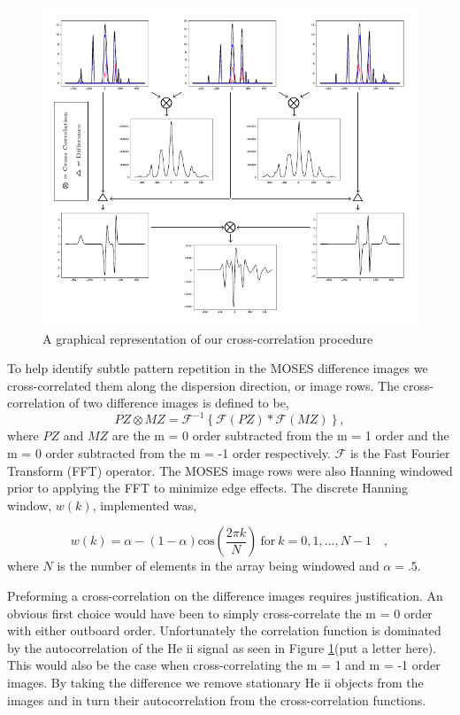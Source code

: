 \documentclass[]{solarphysics}
\begin{document}
\begin{article}
 	 	
 	 	\begin{figure}
 	 		\includegraphics[scale = 1]{methods_fig.pdf}
 	 		\caption{A graphical representation of our cross-correlation procedure}
 	 		\label{fig:methods}
 	 	\end{figure}
	
 	To help identify subtle pattern repetition in the MOSES difference images we cross-correlated them along the dispersion direction, or image rows.  The cross-correlation of two difference images is defined to be,
	 	\begin{equation}
		 	PZ \otimes MZ = \mathcal{F}^{-1} \left\{\mathcal{F}\left(PZ \right)*\mathcal{F}\left(MZ \right)  \right\},
	 	\end{equation}
 	where $PZ$ and $MZ$ are the m = 0 order subtracted from the m = 1 order and the m = 0 order subtracted from the m = -1 order respectively. $\mathcal{F}$ is the Fast Fourier Transform (FFT) operator.  The MOSES image rows were also Hanning windowed prior to applying the FFT to minimize edge effects.  The discrete Hanning window, $w(k)$, implemented was,
 	
		\begin{equation}
			w(k) = \alpha - (1-\alpha)\mathrm{cos}\left( \frac{2\pi k}{N} \right) \ \mathrm{for} \ k = 0,1,...,N-1 \quad ,
			\label{eqn:Hanning}
		\end{equation}
	where $N$ is the number of elements in the array being windowed and $\alpha = .5$.
 	
 	Preforming a cross-correlation on the difference images requires justification.  An obvious first choice would have been to simply cross-correlate the m = 0 order with either outboard order.  Unfortunately the correlation function is dominated by the autocorrelation of the He {\sc ii} signal as seen in Figure \ref{fig:methods}(put a letter here).  This would also be the case when cross-correlating the m = 1 and m = -1 order images.  By taking the difference we remove stationary He {\sc ii} objects from the images and in turn their autocorrelation from the cross-correlation functions.
 	

\end{article}
\end{document}
